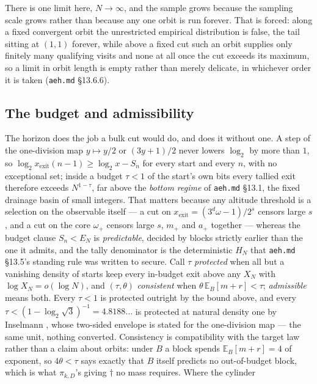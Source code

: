 \documentclass[11pt]{article}
\theoremstyle{remark}
\newcommand{\w}{\omega}
\newcommand{\wnext}{\w_{+}}
\begin{document}
There is one limit here, $N \to \infty$, and the sample grows because the sampling
scale grows rather than because any one orbit is run forever. That is forced: along
a fixed convergent orbit the unrestricted empirical distribution is false, the
tail sitting at $(1,1)$ forever, while above a fixed cut such an orbit
supplies only finitely many qualifying visits and none at all once the cut exceeds
its maximum, so a limit in orbit length is empty rather than merely delicate, in
whichever order it is taken (\texttt{aeh.md} \S13.6.6).

\subsection*{The budget and admissibility}

The horizon does the job a bulk cut would do, and does it without one. A step of
the one-division map $y \mapsto y/2$ or $(3y+1)/2$ never lowers $\log_2$ by more
than $1$, so $\log_2 x_{\mathrm{exit}}(n-1) \ge \log_2 x - S_n$ for every start and
every $n$, with no exceptional set; inside a budget $\tau < 1$ of the start's own
bits every tallied exit therefore exceeds $N^{1-\tau}$, far above the
\emph{bottom regime} of \texttt{aeh.md} \S13.1, the fixed drainage basin of small
integers. That matters because any altitude
threshold is a selection on the observable itself --- a cut on
$x_{\mathrm{exit}} = (3^{d}\w - 1)/2^{s}$ censors large $s$, and a cut on the core
$\wnext$ censors large $s$, $m_+$ and $a_+$ together --- whereas the budget clause
$S_n < E_N$ is \emph{predictable}, decided by blocks strictly earlier than
the one it admits, and the tally denominator is the deterministic $H_N$ that
\texttt{aeh.md} \S13.5's standing rule was written to secure. Call $\tau$
\emph{protected} when all but a
vanishing density of starts keep every in-budget exit above any $X_N$ with
$\log X_N = o(\log N)$, and $(\tau,\theta)$ \emph{consistent} when
$\theta\,\mathbb{E}_B[m+r] < \tau$; \emph{admissible} means both. Every
$\tau < 1$ is protected outright by the bound above, and every
$\tau < (1-\log_2\sqrt3)^{-1} = 4.8188\ldots$ is protected at natural density one
by Inselmann \cite[Thm.~1.1]{inselmann}, whose two-sided envelope is stated for
the one-division map --- the same unit, nothing converted.
Consistency is compatibility with the target law rather than a claim about
orbits: under $B$ a block spends $\mathbb{E}_B[m+r] = 4$ of exponent, so
$4\theta < \tau$ says exactly that $B$ itself predicts no out-of-budget block,
which is what $\pi_{k,D}$'s giving $\dagger$ no mass requires. Where the cylinder
\end{document}
